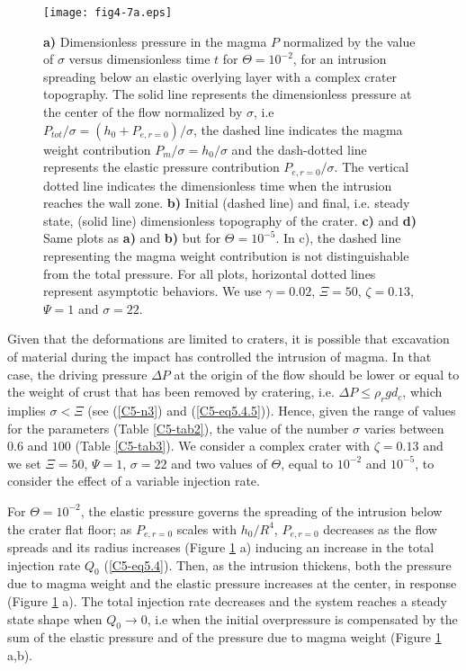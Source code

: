 \begin{figure}[h!]
  \graphicspath{ {/Users/thorey/Documents/These/Submission/Article/FFC_JGR_2013/Paper_APRES_2nd_REVIEW/} }
  \centering
  \noindent\texttt{[image: fig4-7a.eps]}
  \caption{\textbf{a)}  Dimensionless   pressure  in  the   magma  $P$
    normalized by the value of  $\sigma$ versus dimensionless time $t$
    for $\Theta=10^{-2}$, for an  intrusion spreading below an elastic
    overlying layer with a complex  crater topography.  The solid line
    represents the  dimensionless pressure at  the center of  the flow
    normalized              by              $\sigma$,              i.e
    $P_{tot}/\sigma=(h_0+P_{e,r=0})/\sigma$, the dashed line indicates
    the  magma  weight  contribution $P_m/\sigma=h_0/\sigma$  and  the
    dash-dotted  line  represents  the elastic  pressure  contribution
    $P_{e,r=0}/\sigma$.   The  vertical   dotted  line  indicates  the
    dimensionless  time  when the  intrusion  reaches  the wall  zone.
    \textbf{b)} Initial  (dashed line) and final,  i.e.  steady state,
    (solid line)  dimensionless topography of the  crater. \textbf{c)}
    and \textbf{d)} Same plots as  \textbf{a)} and \textbf{b)} but for
    $\Theta=10^{-5}$.  In  c), the dashed line  representing the magma
    weight  contribution   is  not  distinguishable  from   the  total
    pressure.   For  all  plots,  horizontal  dotted  lines  represent
    asymptotic   behaviors.     We   use    $\gamma=0.02$,   $\Xi=50$,
    $\zeta=0.13$, $\Psi=1$ and $\sigma=22$.}
  \label{C5-fig4-7}
\end{figure}
 
Given that  the deformations  are limited to  craters, it  is possible
that  excavation of  material  during the  impact  has controlled  the
intrusion of magma.  In that case,  the driving pressure $\Delta P$ at
the origin of the flow should be lower or equal to the weight of crust
that has been  removed by cratering, i.e.  $\Delta  P\le \rho_r gd_c$,
which implies $\sigma<\Xi$ (see (\ref{C5-n3}) and (\ref{C5-eq5.4.5})).
Hence,  given   the  range  of   values  for  the   parameters  (Table
\ref{C5-tab2}), the value of the  number $\sigma$ varies between $0.6$
and $100$  (Table \ref{C5-tab3}).  We  consider a complex  crater with
$\zeta=0.13$ and we set $\Xi=50$, $\Psi=1$, $\sigma=22$ and two values
of $\Theta$, equal to $10^{-2}$  and $10^{-5}$, to consider the effect
of a variable injection rate.

For $\Theta=10^{-2}$,  the elastic  pressure governs the  spreading of
the intrusion below the crater  flat floor; as $P_{e,r=0}$ scales with
$h_0/R^4$, $P_{e,r=0}$  decreases as the  flow spreads and  its radius
increases (Figure \ref{C5-fig4-7} a) inducing an increase in the total
injection  rate  $Q_{0}$  (\ref{C5-eq5.4}).  Then,  as  the  intrusion
thickens,  both the  pressure  due  to magma  weight  and the  elastic
pressure increases at the  center, in response (Figure \ref{C5-fig4-7}
a). The total injection rate decreases and the system reaches a steady
state   shape  when   $Q_{0}\rightarrow0$,   i.e   when  the   initial
overpressure is compensated by the sum  of the elastic pressure and of
the pressure due to magma weight (Figure \ref{C5-fig4-7} a,b).

